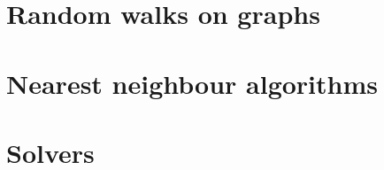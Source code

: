 \section{Random walks on graphs}
\label{randomWalks}


\section{Nearest neighbour algorithms}
\label{nearestNeighbourAlgorithms}


\section{Solvers}
\label{solvers}

